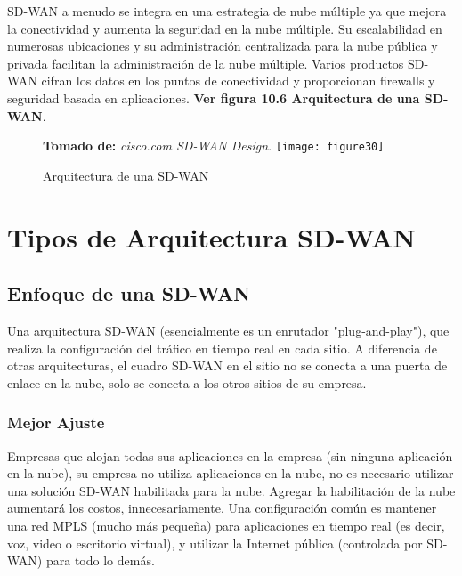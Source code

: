 SD-WAN a menudo se integra en una estrategia de nube múltiple ya que mejora la conectividad y aumenta la seguridad en la nube múltiple. Su escalabilidad en numerosas ubicaciones y su administración centralizada para la nube pública y privada facilitan la administración de la nube múltiple. Varios productos SD-WAN cifran los datos en los puntos de conectividad y proporcionan firewalls y seguridad basada en aplicaciones.
\textbf{Ver figura 10.6 Arquitectura de una SD-WAN}.

\begin{figure}[htbp]
 \textbf{Tomado de:} \textit{cisco.com SD-WAN Design}.
  \centering
    {\texttt{[image: figure30]}}%
  \caption{Arquitectura de una SD-WAN}
  \label{fig:fig2subfig}
\end{figure}


\section{Tipos de Arquitectura SD-WAN}
\label{sec:Tipos de Arquitectura SD-WAN}

\subsection{Enfoque de una SD-WAN}
\label{sec:Enfoque de una SD-WAN}

Una arquitectura SD-WAN (esencialmente es un enrutador "plug-and-play"), que realiza
la configuración del tráfico en tiempo real en cada sitio. A diferencia de otras arquitecturas, el cuadro SD-WAN en el sitio no se conecta a una puerta de enlace en la nube, solo se conecta a los otros sitios de su empresa.

\subsubsection{Mejor Ajuste}
\label{sec:Mejor Ajuste}

Empresas que alojan todas sus aplicaciones en la empresa (sin ninguna aplicación en la nube), su empresa no utiliza aplicaciones en la nube, no es necesario utilizar una solución SD-WAN habilitada para la nube. Agregar la habilitación de la nube aumentará los costos, innecesariamente. Una configuración común es mantener una red MPLS (mucho más pequeña) para aplicaciones en tiempo real (es decir, voz, video o escritorio virtual), y utilizar la Internet pública (controlada por SD-WAN) para todo lo demás.

